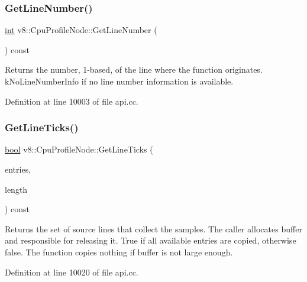 \subsubsection{\texorpdfstring{Get\+Line\+Number()}{GetLineNumber()}}
{\footnotesize\ttfamily \mbox{\hyperlink{classint}{int}} v8\+::\+Cpu\+Profile\+Node\+::\+Get\+Line\+Number (\begin{DoxyParamCaption}{ }\end{DoxyParamCaption}) const}

Returns the number, 1-\/based, of the line where the function originates. k\+No\+Line\+Number\+Info if no line number information is available. 

Definition at line 10003 of file api.\+cc.

\mbox{\label{classv8_1_1CpuProfileNode_a3a05d924e53c241225b9d3bf61af05db}} 
\subsubsection{\texorpdfstring{Get\+Line\+Ticks()}{GetLineTicks()}}
{\footnotesize\ttfamily \mbox{\hyperlink{classbool}{bool}} v8\+::\+Cpu\+Profile\+Node\+::\+Get\+Line\+Ticks (\begin{DoxyParamCaption}\item[{\mbox{\hyperlink{structv8_1_1CpuProfileNode_1_1LineTick}{Line\+Tick}} $\ast$}]{entries,  }\item[{\mbox{\hyperlink{classunsigned}{unsigned}} \mbox{\hyperlink{classint}{int}}}]{length }\end{DoxyParamCaption}) const}

Returns the set of source lines that collect the samples. The caller allocates buffer and responsible for releasing it. True if all available entries are copied, otherwise false. The function copies nothing if buffer is not large enough. 

Definition at line 10020 of file api.\+cc.

\mbox{\label{classv8_1_1CpuProfileNode_a67334450071a60ec3c3cfa58777cc006}} 
